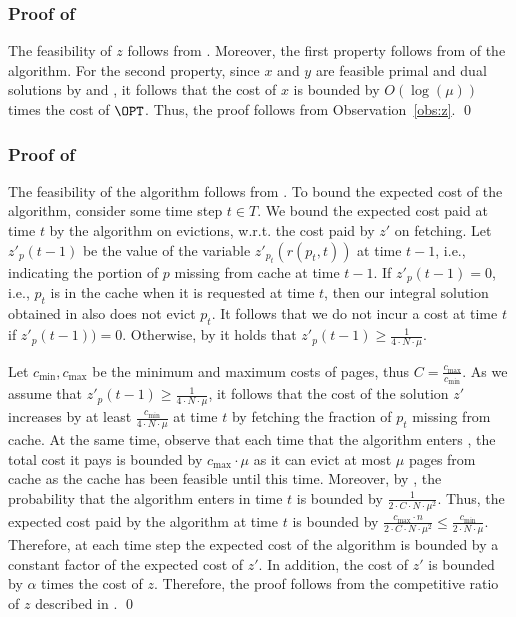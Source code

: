\subsubsection*{Proof of }
The feasibility of $z$ follows from . Moreover, the first property follows from  of the algorithm. For the second property, since $x$ and $y$ are feasible primal and dual solutions by  and , it follows that the cost of $x$ is bounded by $O(\log (\mu))$ times the cost of $\OPT$. Thus, the proof follows from Observation~\ref{obs:z}. \qed

\subsubsection*{Proof of }
The feasibility of the algorithm follows from . To bound the expected cost of the algorithm, consider some time step $t \in T$. We bound the expected cost paid at time $t$ by the algorithm on evictions, w.r.t. the cost paid by $z'$ on fetching. Let $z'_p(t-1)$ be the value of the variable $z'_{p_t}(r(p_t,t))$ at time $t-1$, i.e., indicating the portion of $p$ missing from cache at time $t-1$. If $z'_p(t-1) = 0$, i.e., $p_t$ is in the cache when it is requested at time $t$, then our integral solution obtained in  also does not evict $p_t$. It follows that we do not incur a cost at time $t$ if $z'_p(t-1)) = 0$. Otherwise, by  it holds that $z'_p(t-1) \geq \frac{1}{4 \cdot N \cdot \mu}$. 
	
	Let $c_{\min}, c_{\max}$ be the minimum and maximum costs of pages, thus $C = \frac{c_{\max}}{c_{\min}}$.  As we assume that $z'_p(t-1) \geq \frac{1}{4 \cdot N \cdot \mu}$, it follows that the cost of the solution $z'$ increases by at least $\frac{c_{\min}}{4 \cdot N \cdot \mu}$ at time $t$ by fetching the fraction of $p_t$ missing from cache. At the same time, observe that each time that the algorithm enters , the total cost it pays is bounded by $c_{\max} \cdot \mu$ as it can evict at most $\mu$ pages from cache as the cache has been feasible until this time.  Moreover, by , the probability that the algorithm enters  in time $t$ is bounded by $\frac{1}{2 \cdot C \cdot N \cdot \mu^2}$. Thus, the expected cost paid by the algorithm at time $t$ is bounded by $\frac{c_{\max} \cdot n}{2 \cdot C \cdot N \cdot \mu^2} \leq \frac{c_{\min}}{2 \cdot N \cdot \mu}$. Therefore, at each time step the expected cost of the algorithm is bounded by a constant factor of the expected cost of $z'$. In addition, the cost of $z'$ is bounded by $\alpha$ times the cost of $z$. Therefore, the proof follows from the competitive ratio of $z$ described in . \qed
	

